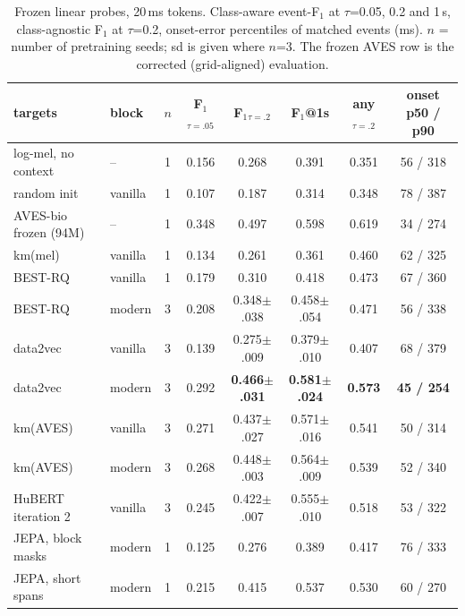 \documentclass[10pt,twocolumn]{article}
\newcommand{\Fone}{F$_1$}
\begin{document}
\begin{table}[t]\centering\small
\caption{Frozen linear probes, 20\,ms tokens. Class-aware event-\Fone{} at $\tau$=0.05, 0.2 and 1\,s, class-agnostic \Fone{} at $\tau$=0.2, onset-error percentiles of matched events (ms). $n$ = number of pretraining seeds; sd is given where $n$=3. The frozen AVES row is the corrected (grid-aligned) evaluation.}
\label{tab:probe}
\begin{tabular}{llcccccc}\toprule
targets & block & $n$ & \Fone{}$_{\tau=.05}$ & \Fone{}$_{\tau=.2}$ & \Fone{}@1s & any$_{\tau=.2}$ & onset p50 / p90\\\midrule
log-mel, no context & -- & 1 & 0.156 & 0.268 & 0.391 & 0.351 & 56 / 318\\
random init & vanilla & 1 & 0.107 & 0.187 & 0.314 & 0.348 & 78 / 387\\
AVES-bio frozen (94M) & -- & 1 & 0.348 & 0.497 & 0.598 & 0.619 & 34 / 274\\\midrule
km(mel) & vanilla & 1 & 0.134 & 0.261 & 0.361 & 0.460 & 62 / 325\\
BEST-RQ & vanilla & 1 & 0.179 & 0.310 & 0.418 & 0.473 & 67 / 360\\
BEST-RQ & modern & 3 & 0.208 & 0.348$\pm$.038 & 0.458$\pm$.054 & 0.471 & 56 / 338\\
data2vec & vanilla & 3 & 0.139 & 0.275$\pm$.009 & 0.379$\pm$.010 & 0.407 & 68 / 379\\
data2vec & modern & 3 & 0.292 & \textbf{0.466$\pm$.031} & \textbf{0.581$\pm$.024} & \textbf{0.573} & \textbf{45 / 254}\\
km(AVES) & vanilla & 3 & 0.271 & 0.437$\pm$.027 & 0.571$\pm$.016 & 0.541 & 50 / 314\\
km(AVES) & modern & 3 & 0.268 & 0.448$\pm$.003 & 0.564$\pm$.009 & 0.539 & 52 / 340\\
HuBERT iteration 2 & vanilla & 3 & 0.245 & 0.422$\pm$.007 & 0.555$\pm$.010 & 0.518 & 53 / 322\\
JEPA, block masks & modern & 1 & 0.125 & 0.276 & 0.389 & 0.417 & 76 / 333\\
JEPA, short spans & modern & 1 & 0.215 & 0.415 & 0.537 & 0.530 & 60 / 270\\
\bottomrule\end{tabular}\end{table}
\end{document}
